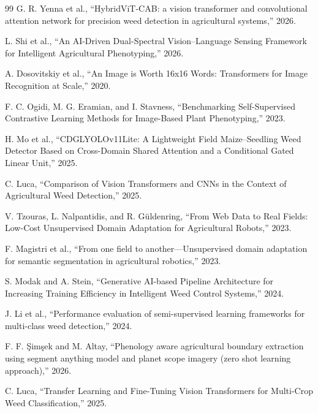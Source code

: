 \begin{singlespace}
\begin{thebibliography}{99}
G. R. Yenna et al., ``HybridViT-CAB: a vision transformer and convolutional attention network for precision weed detection in agricultural systems,'' 2026.

L. Shi et al., ``An AI-Driven Dual-Spectral Vision–Language Sensing Framework for Intelligent Agricultural Phenotyping,'' 2026.


A. Dosovitskiy et al., ``An Image is Worth 16x16 Words: Transformers for Image Recognition at Scale,'' 2020.

F. C. Ogidi, M. G. Eramian, and I. Stavness, ``Benchmarking Self-Supervised Contrastive Learning Methods for Image-Based Plant Phenotyping,'' 2023.

H. Mo et al., ``CDGLYOLOv11Lite: A Lightweight Field Maize–Seedling Weed Detector Based on Cross-Domain Shared Attention and a Conditional Gated Linear Unit,'' 2025.

C. Luca, ``Comparison of Vision Transformers and CNNs in the Context of Agricultural Weed Detection,'' 2025.

V. Tzouras, L. Nalpantidis, and R. Güldenring, ``From Web Data to Real Fields: Low-Cost Unsupervised Domain Adaptation for Agricultural Robots,'' 2023.

F. Magistri et al., ``From one field to another—Unsupervised domain adaptation for semantic segmentation in agricultural robotics,'' 2023.

S. Modak and A. Stein, ``Generative AI-based Pipeline Architecture for Increasing Training Efficiency in Intelligent Weed Control Systems,'' 2024.

J. Li et al., ``Performance evaluation of semi-supervised learning frameworks for multi-class weed detection,'' 2024.

F. F. Şimşek and M. Altay, ``Phenology aware agricultural boundary extraction using segment anything model and planet scope imagery (zero shot learning approach),'' 2026.

C. Luca, ``Transfer Learning and Fine-Tuning Vision Transformers for Multi-Crop Weed Classification,'' 2025.


\end{thebibliography}
\end{singlespace}
